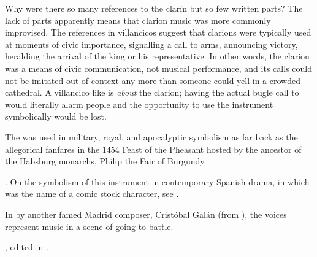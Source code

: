 Why were there so many references to the clarín but so few written parts?
The lack of parts apparently means that clarion music was more commonly
improvised.  
The references in villancicos suggest that clarions were typically used at
moments of civic importance, signalling a call to arms, announcing victory,
heralding the arrival of the king or his representative.
In other words, the clarion was a means of civic communication, not musical
performance, and its calls could not be imitated out of context any more than
someone could yell  in a crowded cathedral.%
A villancico like  is
\emph{about} the clarion; having the actual bugle call to would literally alarm
people and the opportunity to use the instrument symbolically would be lost.%

The  was used in military, royal, and apocalyptic symbolism as far
back as the allegorical  fanfares in the 1454 Feast of the
Pheasant hosted by the ancestor of the Habsburg monarchs, Philip the Fair of
Burgundy.%
\begin{Footnote}
    \Autocites
    [340--380]{LaMarche:Memoires}
    {Bloxam:JNV}
    {Perkins:Patronage15C}.
    On the symbolism of this instrument in contemporary Spanish drama, in which
     was the name of a comic stock character, see
    .
\end{Footnote}
In  by another famed Madrid composer, Cristóbal
Galán (from ), the voices represent  music in a scene
of  going to battle.%
\begin{Footnote} 
    , 
    edited in \autocite[555--565]{CaberoPueyo:PhD}.
\end{Footnote}

